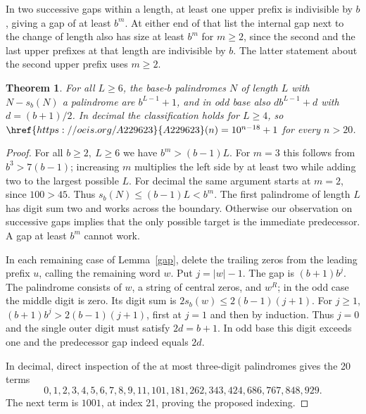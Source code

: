 \documentclass[11pt,letterpaper]{article}
\newtheorem{theorem}{Theorem}
\newcommand{\oeis}[1]{\href{https://oeis.org/A#1}{A#1}}
\begin{document}
In two successive gaps within a length, at least one upper prefix is indivisible by \(b\), giving a gap of at least \(b^m\). At either end of that list the internal gap next to the change of length also has size at least \(b^m\) for \(m\ge2\), since the second and the last upper prefixes at that length are indivisible by \(b\). The latter statement about the second upper prefix uses \(m\ge2\).

\begin{theorem}\label{minus}
For all \(L\ge6\), the base-\(b\) palindromes \(N\) of length \(L\) with \(N-s_b(N)\) a palindrome are \(b^{L-1}+1\), and in odd base also \(d b^{L-1}+d\) with \(d=(b+1)/2\). In decimal the classification holds for \(L\ge4\), so \(\oeis{229623}(n)=10^{n-18}+1\) for every \(n>20\).
\end{theorem}
\begin{proof}
For all \(b\ge2,\ L\ge6\) we have \(b^m>(b-1)L\). For \(m=3\) this follows from \(b^3>7(b-1)\); increasing \(m\) multiplies the left side by at least two while adding two to the largest possible \(L\). For decimal the same argument starts at \(m=2\), since \(100>45\). Thus \(s_b(N)\le(b-1)L<b^m\). The first palindrome of length \(L\) has digit sum two and works across the boundary. Otherwise our observation on successive gaps implies that the only possible target is the immediate predecessor. A gap at least \(b^m\) cannot work.

In each remaining case of Lemma~\ref{gap}, delete the trailing zeros from the leading prefix \(u\), calling the remaining word \(w\). Put \(j=|w|-1\). The gap is \((b+1)b^j\). The palindrome consists of \(w\), a string of central zeros, and \(w^R\); in the odd case the middle digit is zero. Its digit sum is \(2s_b(w)\le2(b-1)(j+1)\). For \(j\ge1\), \((b+1)b^j>2(b-1)(j+1)\), first at \(j=1\) and then by induction. Thus \(j=0\) and the single outer digit must satisfy \(2d=b+1\). In odd base this digit exceeds one and the predecessor gap indeed equals \(2d\).

In decimal, direct inspection of the at most three-digit palindromes gives the 20 terms
\[
 0,1,2,3,4,5,6,7,8,9,11,101,181,262,343,424,686,767,848,929.
\]
The next term is \(1001\), at index 21, proving the proposed indexing.
\end{proof}
\end{document}
